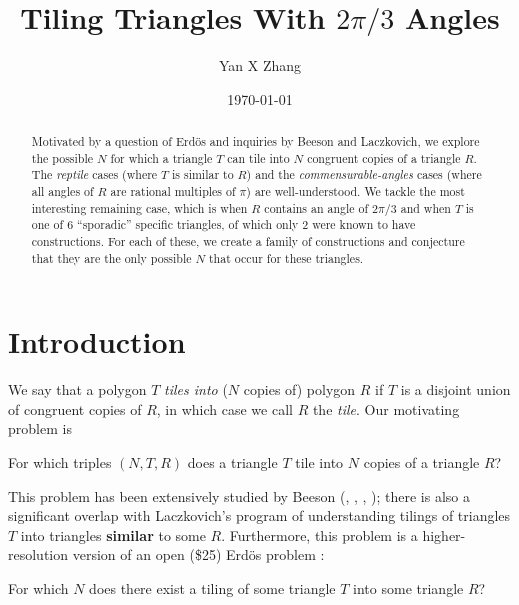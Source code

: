 \documentclass{amsart}
\title{Tiling Triangles With $2\pi/3$ Angles}
\author{Yan X Zhang}
\date{\today}
\theoremstyle{plain}
\theoremstyle{definition}
\begin{document}
\maketitle

\begin{abstract}
    Motivated by a question of Erd\"{o}s and inquiries by Beeson and Laczkovich, we explore the possible $N$ for which a triangle $T$ can tile into $N$ congruent copies of a triangle $R$. The \emph{reptile} cases (where $T$ is similar to $R$) and the \emph{commensurable-angles} cases (where all angles of $R$ are rational multiples of $\pi$) are well-understood. We tackle the most interesting remaining case, which is when $R$ contains an angle of $2\pi/3$ and when $T$ is one of $6$ ``sporadic'' specific triangles, of which only $2$ were known to have constructions.  For each of these, we create a family of constructions and conjecture that they are the only possible $N$ that occur for these triangles. 
\end{abstract}

\section{Introduction}

We say that a polygon $T$ \emph{tiles into} ($N$ copies of) polygon $R$ if $T$ is a disjoint union of congruent copies of $R$, in which case we call $R$ the \emph{tile}. Our motivating problem is

\begin{tcolorbox}
For which triples $(N,T,R)$ does a triangle $T$ tile into $N$ copies of a triangle $R$?
\end{tcolorbox}

This problem has been extensively studied by Beeson (\cite{beeson-seven}, \cite{beeson-equilateral}, \cite{beeson-isosceles}, \cite{beeson-triangletiling3}); there is also a significant overlap with  Laczkovich's program of understanding tilings of triangles $T$ into triangles \textbf{similar} to some $R$. Furthermore, this problem is a higher-resolution version of an open (\$25) Erd\"{o}s problem \cite{soifer2009}:

\begin{tcolorbox}
    For which $N$ does there exist a tiling of some triangle $T$ into some triangle $R$?
\end{tcolorbox}
\end{document}
